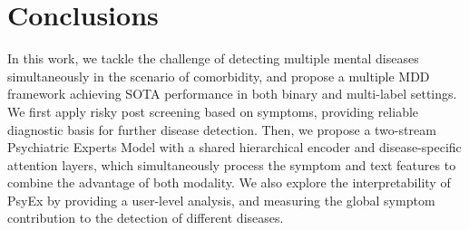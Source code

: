 \section{Conclusions}

In this work, we tackle the challenge of detecting multiple mental diseases simultaneously in the scenario of comorbidity, and propose a multiple MDD framework achieving SOTA performance in both binary and multi-label settings. 
We first apply risky post screening based on symptoms, providing reliable diagnostic basis for further disease detection. Then, we propose a two-stream Psychiatric Experts Model with a shared hierarchical encoder and disease-specific attention layers, which simultaneously process the symptom and text features to combine the advantage of both modality. We also explore the interpretability of PsyEx by providing a user-level analysis, and measuring the global symptom contribution to the detection of different diseases. 
